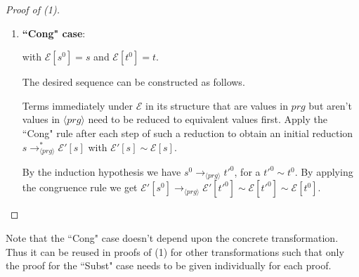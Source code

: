 \documentclass[11pt]{article} %
\begin{document}
\begin{proof}[Proof of (1)]
\begin{enumerate}
\begin{itemize}
\begin{enumerate}
By the induction hypothesis applied to $q'_r$, we have the property for $r'^0$, that is, for every equation $`` q_h = t_h "$ in $H'$, $q_h$ is equivalent to a sub-copattern of the left-hand side $q'_r$ of $r'^0$. But $q'_r$ is in turn a sub-copattern of $q_r$.

\end{enumerate}

\end{itemize}

This concludes the proof for the ``Subst" case.

\item \textbf{``Cong" case}:

\begin{prooftree}
\end{prooftree}

with $\mathcal{E}[s^0] = s$ and $\mathcal{E}[t^0] = t$.

The desired sequence can be constructed as follows.

Terms immediately under $\mathcal{E}$ in its structure that are values in $prg$ but aren't values in $\langle prg \rangle$ need to be reduced to equivalent values first. Apply the ``Cong" rule after each step of such a reduction to obtain an initial reduction $s \longrightarrow^*_{\langle prg \rangle} \mathcal{E'}[s]$ with $\mathcal{E'}[s] \sim \mathcal{E}[s]$.

By the induction hypothesis we have $s^0 \longrightarrow_{\langle prg \rangle} t'^0$, for a $t'^0 \sim t^0$. By applying the congruence rule we get $\mathcal{E'}[s^0] \longrightarrow_{\langle prg \rangle} \mathcal{E'}[t'^0] \sim \mathcal{E}[t'^0] \sim \mathcal{E}[t^0]$.

\end{enumerate}

\end{proof}

Note that the ``Cong" case doesn't depend upon the concrete transformation. Thus it can be reused in proofs of (1) for other transformations such that only the proof for the ``Subst" case needs to be given individually for each proof.
\end{document}
